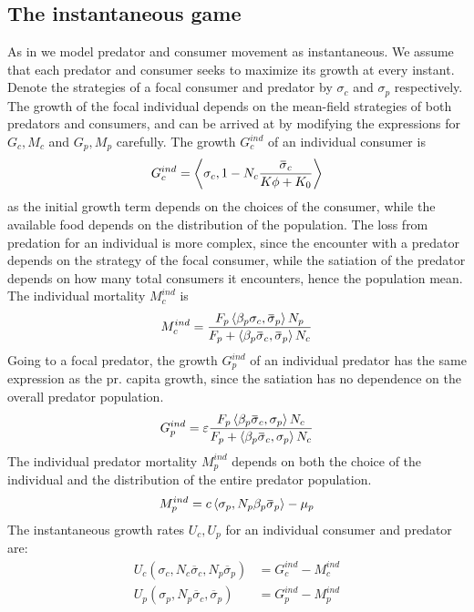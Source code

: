 \subsection{The instantaneous game}
As in  we model predator and consumer movement as instantaneous. We assume that each predator and consumer seeks to maximize its growth at every instant. Denote the strategies of a focal consumer and predator by $\sigma_c$ and $\sigma_p$ respectively.  The growth of the focal individual depends on the mean-field strategies of both predators and consumers, and can be arrived at by modifying the expressions for $G_c,M_c$ and $G_p, M_p$ carefully.
The growth $G_c^{ind}$ of an individual consumer is
\begin{equation}
  G_c^{ind} = \ip{\sigma_c}{1-N_c \frac{\overbar{\sigma}_c}{K\phi + K_0}}
\end{equation}
as the initial growth term depends on the choices of the consumer, while the available food depends on the distribution of the population. The loss from predation for an individual is more complex, since the encounter with a predator depends on the strategy of the focal consumer, while the satiation of the predator depends on how many total consumers it encounters, hence the population mean. The individual mortality $M_c^{ind}$ is
\begin{equation}
  M_c^{ind} =  \frac{F_p \ip{\beta_p \sigma_c}{\overbar{\sigma}_p} N_p}{F_p + \ip{\beta_p \overbar{\sigma}_c}{\overbar{\sigma}_p} N_c}
\end{equation}
Going to a focal predator, the growth $G_p^{ind}$ of an individual predator has the same expression as the pr. capita growth, since the satiation has no dependence on the overall predator population.
\begin{equation}
  G_p^{ind} = \epsilon \frac{F_p \ip{\beta_p \overbar{\sigma}_c}{\sigma_p} N_c}{F_p + \ip{\beta_p \overbar{\sigma}_c}{\sigma_p} N_c}
\end{equation}
The individual predator mortality $M_p^{ind}$ depends on both the choice of the individual and the distribution of the entire predator population.
\begin{equation}
  M_p^{ind} =  c \ip{\sigma_p}{N_p\beta_p \overbar{\sigma}_p}  - \mu_p
\end{equation}
The instantaneous growth rates $U_c,U_p$ for an individual consumer and predator are:
\begin{align}
  U_c(\sigma_c, N_c \overbar{\sigma}_c, N_p\overbar{\sigma}_p) &=  G_c^{ind} - M_c^{ind} \\
  U_p(\sigma_p, N_p \overbar{\sigma}_c, \overbar{\sigma}_p) &= G_p^{ind} - M_p^{ind}
\end{align}
\begin{comment}
We convert both mean-field payoffs into a monomorphic equivalent form as in \cref{def:correspondence}

\end{comment}
